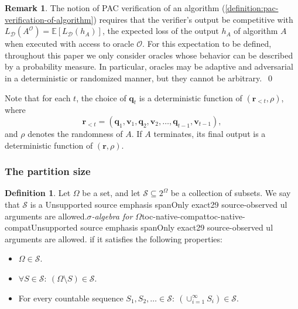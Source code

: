 \documentclass[11pt]{article}
\numberwithin{equation}{section}
\theoremstyle{definition}
\newtheorem{definition}[theorem]{Definition}
\newtheorem{remark}[theorem]{Remark}
\theoremstyle{plain}
\newcommand{\ul}[1]{\begingroup\def\TocFiniteEmphResult{\PackageError{toc-native-compat}{Unsupported source emphasis span}{Only exact29 source-observed ul arguments are allowed.}}\ifstrequal{#1}{total variation distance}{\def\TocFiniteEmphResult{\emph{#1}}}{}\ifstrequal{#1}{$\cH$ shatters $X$}{\def\TocFiniteEmphResult{\emph{#1}}}{}\ifstrequal{#1}{Vapnik--Chervonenkis (VC) dimension of $\cH$}{\def\TocFiniteEmphResult{\emph{#1}}}{}\ifstrequal{#1}{loss function}{\def\TocFiniteEmphResult{\emph{#1}}}{}\ifstrequal{#1}{empirical loss of $h$ with respect to $S$}{\def\TocFiniteEmphResult{\emph{#1}}}{}\ifstrequal{#1}{loss of $h$ with respect to $\cD$}{\def\TocFiniteEmphResult{\emph{#1}}}{}\ifstrequal{#1}{loss of $\cH$ with respect to $\cD$}{\def\TocFiniteEmphResult{\emph{#1}}}{}\ifstrequal{#1}{$0$-$1$ loss}{\def\TocFiniteEmphResult{\emph{#1}}}{}\ifstrequal{#1}{agnostically PAC learnable}{\def\TocFiniteEmphResult{\emph{#1}}}{}\ifstrequal{#1}{sample complexity}{\def\TocFiniteEmphResult{\emph{#1}}}{}\ifstrequal{#1}{PAC verifiable with respect to $\mathbb{D}$ using random samples}{\def\TocFiniteEmphResult{\emph{#1}}}{}\ifstrequal{#1}{proper}{\def\TocFiniteEmphResult{\emph{#1}}}{}\ifstrequal{#1}{proper PAC verifiable}{\def\TocFiniteEmphResult{\emph{#1}}}{}\ifstrequal{#1}{improper}{\def\TocFiniteEmphResult{\emph{#1}}}{}\ifstrequal{#1}{algorithm $A$ with access to oracles $\{\cO_\cD\}_{\cD \in \bbD}$ is PAC verifiable with respect to $\mathbb{D}$ by a verification protocol that uses random samples}{\def\TocFiniteEmphResult{\emph{#1}}}{}\ifstrequal{#1}{$(\tau,T,\delta)$-accurate for $\cX$}{\def\TocFiniteEmphResult{\emph{#1}}}{}\ifstrequal{#1}{$S$ is an $\varepsilon$-sample for $\cD$ with respect to~$\cF$}{\def\TocFiniteEmphResult{\emph{#1}}}{}\ifstrequal{#1}{statistical query}{\def\TocFiniteEmphResult{\emph{#1}}}{}\ifstrequal{#1}{statistical query oracle for $\cD$ with precision $\tau$}{\def\TocFiniteEmphResult{\emph{#1}}}{}\ifstrequal{#1}{statistical query algorithm}{\def\TocFiniteEmphResult{\emph{#1}}}{}\ifstrequal{#1}{transcript}{\def\TocFiniteEmphResult{\emph{#1}}}{}\ifstrequal{#1}{$\sigma$-algebra for $\Omega$}{\def\TocFiniteEmphResult{\emph{#1}}}{}\ifstrequal{#1}{$\sigma$-algebra generated by $\cA$ for $\Omega$}{\def\TocFiniteEmphResult{\emph{#1}}}{}\ifstrequal{#1}{$\sigma$-algebra generated by $\cF$ for $\Omega$}{\def\TocFiniteEmphResult{\emph{#1}}}{}\ifstrequal{#1}{atoms of $\cS$}{\def\TocFiniteEmphResult{\emph{#1}}}{}\ifstrequal{#1}{partition size of $\cF$}{\def\TocFiniteEmphResult{\emph{#1}}}{}\ifstrequal{#1}{efficiently evaluable}{\def\TocFiniteEmphResult{\emph{#1}}}{}\ifstrequal{#1}{efficiently manipulable}{\def\TocFiniteEmphResult{\emph{#1}}}{}\ifstrequal{#1}{$\varepsilon$-maximizing with respect to $A$ and $\bbD$}{\def\TocFiniteEmphResult{\emph{#1}}}{}\TocFiniteEmphResult\endgroup}
\theoremstyle{definition}\newtheorem{notation}[theorem]{Notation}\theoremstyle{plain}\raggedbottom
\newcommand{\roundBrackets}[1]{
	\mathopen{}\left(#1\right)\mathclose{}
}
\newcommand{\squareBrackets}[1]{
	\mathopen{}\left[#1\right]\mathclose{}
}
\newcommand{\customFunctionSquare}[2]{
	#1\squareBrackets{#2}
}
\newcommand{\bbFunction}[2]{
	\customFunctionSquare{\mathbb{#1}}{#2}
}
\newcommand{\EE}[1]{\bbFunction{E}{#1}}
\newcommand{\Loss}[2]{\LossNameEmpty_{#1}\roundBrackets{#2}}
\newcommand{\LossNameEmpty}{L}
\newcommand{\bbD}{\mathbb{D}}
\newcommand{\cA}{\mathcal{A}}
\newcommand{\cD}{\mathcal{D}}
\newcommand{\cF}{\mathcal{F}}
\newcommand{\cH}{\mathcal{H}}
\newcommand{\cO}{\mathcal{O}}
\newcommand{\cS}{\mathcal{S}}
\newcommand{\cX}{\mathcal{X}}
\newcommand{\bq}{\mathbf{q}}
\newcommand{\br}{\mathbf{r}}
\newcommand{\bv}{\mathbf{v}}
\newcommand{\1}{\mathds{1}}
\newcommand{\numQueries}{n}
\newcommand{\timestep}{t}
\begin{document}
\begin{remark}
	The notion of PAC verification of an algorithm (\cref{definition:pac-verification-of-algorithm}) requires that the verifier's output be competitive with $\Loss{\cD}{A^\cO} = \EE{\Loss{\cD}{h_A}}$, the expected loss of the output $h_A$ of algorithm $A$ when executed with access to oracle $\cO$. For this expectation to be defined, throughout this paper we only consider oracles whose behavior can be described by a probability measure. In particular, oracles may be adaptive and adversarial in a deterministic or randomized manner, but they cannot be arbitrary.~\qed
\end{remark}


Note that for each $t$, the choice of $\bq_t$ is a deterministic function of $(\br_{< t},\rho)$, where 
\[
	\br_{< t} = (\bq_1,\bv_1,\bq_2,\bv_2,\dots,\bq_{t-1},\bv_{t-1}),
\]
and $\rho$ denotes the randomness of $A$. If $A$ terminates, its final output is a deterministic function of $(\br,\rho)$.

\subsubsection{The partition size}

\begin{definition}
	Let $\Omega$ be a set, and let $\cS \subseteq 2^\Omega$ be a collection of subsets. We say that $\cS$ is a \ul{$\sigma$-algebra for $\Omega$} if it satisfies the following properties:
	\begin{itemize}
		\item{$\Omega \in \cS$.}
		\item{$\forall S \in \cS: ~ (\Omega \setminus S) \in \cS$.}
		\item{For every countable sequence $S_1,S_2,\ldots \in \cS: ~ \left(\cup_{i=1}^\infty S_i\right) \in \cS$.}
	\end{itemize}
\end{definition}
\end{document}
